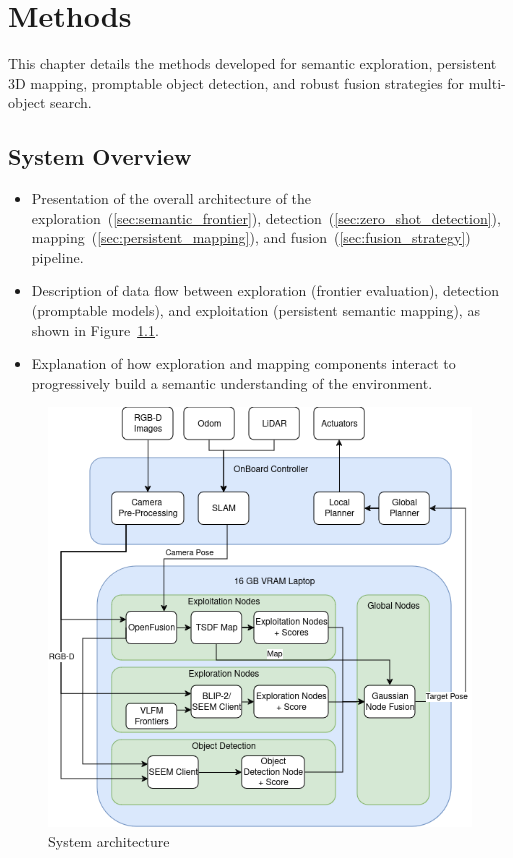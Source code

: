 \chapter{Methods}
This chapter details the methods developed for semantic exploration, persistent 3D mapping, promptable object detection, and robust fusion strategies for multi-object search. 

\section{System Overview}
\begin{itemize}
    \item Presentation of the overall architecture of the exploration~(\ref{sec:semantic_frontier}), detection~(\ref{sec:zero_shot_detection}), mapping~(\ref{sec:persistent_mapping}), and fusion~(\ref{sec:fusion_strategy}) pipeline.
    \item Description of data flow between exploration (frontier evaluation), detection (promptable models), and exploitation (persistent semantic mapping), as shown in Figure~\ref{fig:system_overview}.
    \item Explanation of how exploration and mapping components interact to progressively build a semantic understanding of the environment.
\end{itemize}

\begin{figure}[h!]
    \centering
    \includegraphics[width=\textwidth]{Images/03_methods/Master_Thesis_Overview.drawio.png}
    \caption{System architecture}
    \label{fig:system_overview}
\end{figure}

